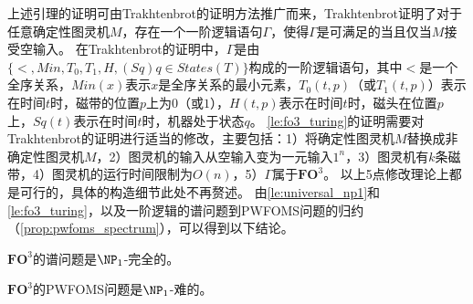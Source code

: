 \documentclass[12pt,UTF8,AutoFakeBold=3,a4paper]{ctexart} %
\newcommand{\sentence}{\Gamma}
\newcommand{\fothree}{\ensuremath{\mathbf{FO}^3}}
\begin{document}
上述引理的证明可由Trakhtenbrot的证明方法推广而来，Trakhtenbrot证明了对于任意确定性图灵机$M$，存在一个一阶逻辑语句$\sentence$，使得$\sentence$是可满足的当且仅当$M$接受空输入。
在Trakhtenbrot的证明中，$\sentence$是由$\{<, Min, T_0, T_1, H, (Sq)q\in States(T)\}$构成的一阶逻辑语句，其中$<$是一个全序关系，$Min(x)$表示$x$是全序关系的最小元素，$T_0(t, p)$（或$T_1(t, p)$）表示在时间$t$时，磁带的位置$p$上为$0$（或$1$），$H(t, p)$表示在时间$t$时，磁头在位置$p$上，$Sq(t)$表示在时间$t$时，机器处于状态$q$。
\cref{le:fo3_turing}的证明需要对Trakhtenbrot的证明进行适当的修改，主要包括：1）将确定性图灵机$M$替换成非确定性图灵机$M$，2）图灵机的输入从空输入变为一元输入$1^n$，3）图灵机有$k$条磁带，4）图灵机的运行时间限制为$O(n)$，5）$\sentence$属于\fothree{}。
以上5点修改理论上都是可行的，具体的构造细节此处不再赘述。
由\cref{le:universal_np1}和\cref{le:fo3_turing}，以及一阶逻辑的谱问题到PWFOMS问题的归约（\cref{prop:pwfoms_spectrum}），可以得到以下结论。
\begin{theorem}
  \fothree{}的谱问题是$\NP_1$-完全的。
\end{theorem}
\begin{theorem}\label{thm:fo3_hard}
  \fothree{}的PWFOMS问题是$\NP_1$-难的。
\end{theorem}



\end{document}
